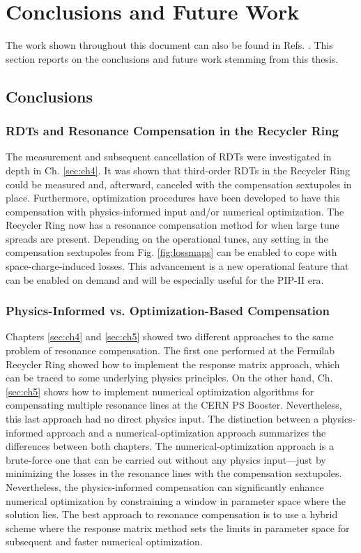 \chapter{Conclusions and Future Work}
\label{sec:ch7}

The work shown throughout this document can also be found in Refs. \cite{cris1,cris2, cris3}. This section reports on the conclusions and future work stemming from this thesis.

\section{Conclusions}

\subsection{RDTs and Resonance Compensation in the Recycler Ring}

The measurement and subsequent cancellation of RDTs were investigated in depth in Ch. \ref{sec:ch4}. It was shown that third-order RDTs in the Recycler Ring could be measured and, afterward, canceled with the compensation sextupoles in place. Furthermore, optimization procedures have been developed to have this compensation with physics-informed input and/or numerical optimization. The Recycler Ring now has a resonance compensation method for when large tune spreads are present. Depending on the operational tunes, any setting in the compensation sextupoles from Fig. \ref{fig:lossmaps} can be enabled to cope with space-charge-induced losses. This advancement is a new operational feature that can be enabled on demand and will be especially useful for the PIP-II era. 

\subsection{Physics-Informed vs. Optimization-Based Compensation}

Chapters \ref{sec:ch4} and \ref{sec:ch5} showed two different approaches to the same problem of resonance compensation. The first one performed at the Fermilab Recycler Ring showed how to implement the response matrix approach, which can be traced to some underlying physics principles. On the other hand, Ch. \ref{sec:ch5} shows how to implement numerical optimization algorithms for compensating multiple resonance lines at the CERN PS Booster. Nevertheless, this last approach had no direct physics input. The distinction between a physics-informed approach and a numerical-optimization approach summarizes the differences between both chapters. The numerical-optimization approach is a brute-force one that can be carried out without any physics input---just by minimizing the losses in the resonance lines with the compensation sextupoles. Nevertheless, the physics-informed compensation can significantly enhance numerical optimization by constraining a window in parameter space where the solution lies. The best approach to resonance compensation is to use a hybrid scheme where the response matrix method sets the limits in parameter space for subsequent and faster numerical optimization. 


